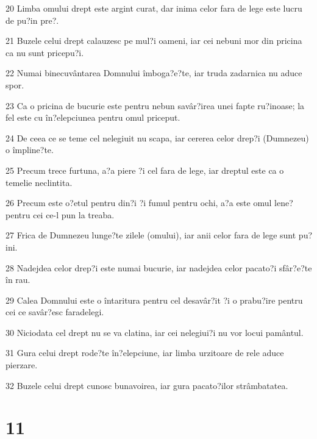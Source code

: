 \par 20 Limba omului drept este argint curat, dar inima celor fara de lege este lucru de pu?in pre?.
\par 21 Buzele celui drept calauzesc pe mul?i oameni, iar cei nebuni mor din pricina ca nu sunt pricepu?i.
\par 22 Numai binecuvântarea Domnului îmboga?e?te, iar truda zadarnica nu aduce spor.
\par 23 Ca o pricina de bucurie este pentru nebun savâr?irea unei fapte ru?inoase; la fel este cu în?elepciunea pentru omul priceput.
\par 24 De ceea ce se teme cel nelegiuit nu scapa, iar cererea celor drep?i (Dumnezeu) o împline?te.
\par 25 Precum trece furtuna, a?a piere ?i cel fara de lege, iar dreptul este ca o temelie neclintita.
\par 26 Precum este o?etul pentru din?i ?i fumul pentru ochi, a?a este omul lene? pentru cei ce-l pun la treaba.
\par 27 Frica de Dumnezeu lunge?te zilele (omului), iar anii celor fara de lege sunt pu?ini.
\par 28 Nadejdea celor drep?i este numai bucurie, iar nadejdea celor pacato?i sfâr?e?te în rau.
\par 29 Calea Domnului este o întaritura pentru cel desavâr?it ?i o prabu?ire pentru cei ce savâr?esc faradelegi.
\par 30 Niciodata cel drept nu se va clatina, iar cei nelegiui?i nu vor locui pamântul.
\par 31 Gura celui drept rode?te în?elepciune, iar limba urzitoare de rele aduce pierzare.
\par 32 Buzele celui drept cunosc bunavoirea, iar gura pacato?ilor strâmbatatea.

\chapter{11}

